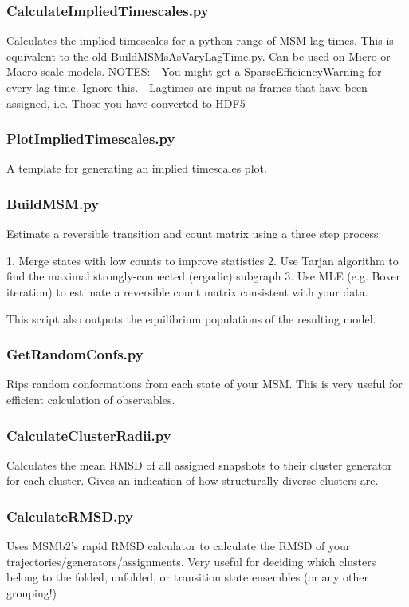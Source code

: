 \documentclass[12pt]{article}
\begin{document}
\subsubsection{CalculateImpliedTimescales.py}
Calculates the implied timescales for a python range of MSM lag times. This is equivalent to the old BuildMSMsAsVaryLagTime.py. Can be used on Micro or Macro scale models.  
	NOTES:
  	- You might get a SparseEfficiencyWarning for every lag time. Ignore this.
	- Lagtimes are input as frames that have been assigned, i.e. Those you have converted to HDF5
	
\subsubsection{PlotImpliedTimescales.py}
A template for generating an implied timescales plot.

\subsubsection{BuildMSM.py}
Estimate a reversible transition and count matrix using a three step process:

1. Merge states with low counts to improve statistics
2. Use Tarjan algorithm to find the maximal strongly-connected (ergodic) subgraph
3. Use MLE (e.g. Boxer iteration) to estimate a reversible count matrix consistent with your data.

This script also outputs the equilibrium populations of the resulting model.

\subsubsection{GetRandomConfs.py}
Rips random conformations from each state of your MSM. This is very useful for efficient calculation of observables.

\subsubsection{CalculateClusterRadii.py}
Calculates the mean RMSD of all assigned snapshots to their cluster generator for each cluster. Gives an indication of how structurally diverse clusters are.

\subsubsection{CalculateRMSD.py}
Uses MSMb2's rapid RMSD calculator to calculate the RMSD of your trajectories/generators/assignments. Very useful for deciding which clusters belong to the folded, unfolded, or transition state ensembles (or any other grouping!)
\end{document}
